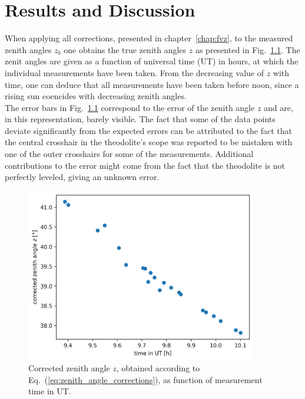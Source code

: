 
\chapter{Results and Discussion}

When applying all corrections, presented in chapter~\ref{chap:fvz}, to the measured zenith angles $z_b$ one obtains the true zenith angles $z$ as presented in Fig.~\ref{fig:zenith}. The zenit angles are given as a function of universal time (UT) in hours, at which the individual measurements have been taken. 
From the decreasing value of $z$ with time, one can deduce that all measurements have been taken before noon, since a rising sun coencides with decreasing zenith angles. \\ The error bars in Fig.~\ref{fig:zenith} correspond to the error of the zenith angle $z$ and are, in this representation, barely visible. The fact that some of the data points deviate significantly from the expected errors can be attributed to the fact that the central crosshair in the theodolite's scope was reported to be mistaken with one of the outer crosshairs for some of the measurements. Additional contributions to the error might come from the fact that the theodolite is not perfectly leveled, giving an unknown error.\\


\begin{figure}[]
    \centering
    \includegraphics[width=0.9\textwidth]{05-Fazit/zenith_angle_plot.png}
    \caption{Corrected zenith angle $z$, obtained according to Eq.~(\ref{eq:zenith_angle_corrections}), as function of measurement time in UT.}
    \label{fig:zenith}
\end{figure}

\label{chap:fazit}


